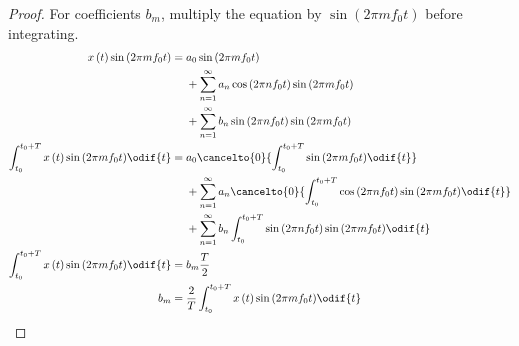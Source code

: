 \documentclass{article}
\begin{document}
\begin{proof}
    For coefficients \(b_m\), multiply the equation by \(\sin{\left( 2 \pi m f_0 t \right)}\) before integrating.
    \begin{align*}
        x\left( t \right) \sin{\left( 2 \pi m f_0 t \right)}                               & = \begin{aligned}[t]
                                                                                                    & a_0 \sin{\left( 2 \pi m f_0 t \right)}                                                          \\
                                                                                                    & + \sum_{n = 1}^\infty a_n \cos{\left( 2 \pi n f_0 t \right)} \sin{\left( 2 \pi m f_0 t \right)} \\
                                                                                                    & + \sum_{n = 1}^\infty b_n \sin{\left( 2 \pi n f_0 t \right)} \sin{\left( 2 \pi m f_0 t \right)}
                                                                                               \end{aligned}                                                    \\
        \int_{t_0}^{t_0 + T} x\left( t \right) \sin{\left( 2 \pi m f_0 t \right)} \odif{t} & = \begin{aligned}[t]
                                                                                                    & a_0 \cancelto{0}{\int_{t_0}^{t_0 + T} \sin{\left( 2 \pi m f_0 t \right)} \odif{t}}                                                          \\
                                                                                                    & + \sum_{n = 1}^\infty a_n \cancelto{0}{\int_{t_0}^{t_0 + T} \cos{\left( 2 \pi n f_0 t \right)} \sin{\left( 2 \pi m f_0 t \right)} \odif{t}} \\
                                                                                                    & + \sum_{n = 1}^\infty b_n \int_{t_0}^{t_0 + T} \sin{\left( 2 \pi n f_0 t \right)} \sin{\left( 2 \pi m f_0 t \right)} \odif{t}
                                                                                               \end{aligned} \\
        \int_{t_0}^{t_0 + T} x\left( t \right) \sin{\left( 2 \pi m f_0 t \right)} \odif{t} & = b_m \frac{T}{2}                                                                                                                                       \\
        b_m                                                                                & = \frac{2}{T} \int_{t_0}^{t_0 + T} x\left( t \right) \sin{\left( 2 \pi m f_0 t \right)} \odif{t}
    \end{align*}
\end{proof}
\end{document}
